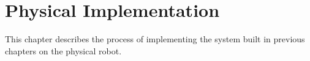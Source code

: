 \chapter{Physical Implementation}
This chapter describes the process of implementing the system built in previous chapters on the physical robot.